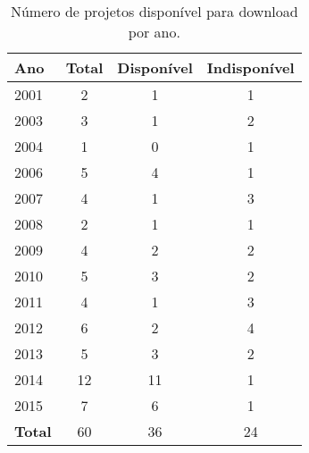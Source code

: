 \begin{table}[h]
\caption{Número de projetos disponível para download por ano.}
\centering
\begin{tabular}{l c c c}
  \hline
  {\bf Ano} & {\bf Total} & {\bf Disponível} & {\bf Indisponível} \\
  \hline
  2001 & 2 & 1 & 1 \\
  2003 & 3 & 1 & 2 \\
  2004 & 1 & 0 & 1 \\
  2006 & 5 & 4 & 1 \\
  2007 & 4 & 1 & 3 \\
  2008 & 2 & 1 & 1 \\
  2009 & 4 & 2 & 2 \\
  2010 & 5 & 3 & 2 \\
  2011 & 4 & 1 & 3 \\
  2012 & 6 & 2 & 4 \\
  2013 & 5 & 3 & 2 \\
  2014 & 12 & 11 & 1 \\
  2015 & 7 & 6 & 1 \\
  \hline
  {\bf Total} & 60 & 36 & 24 \\
  \hline
\end{tabular}
\label{available-table}
\end{table}
